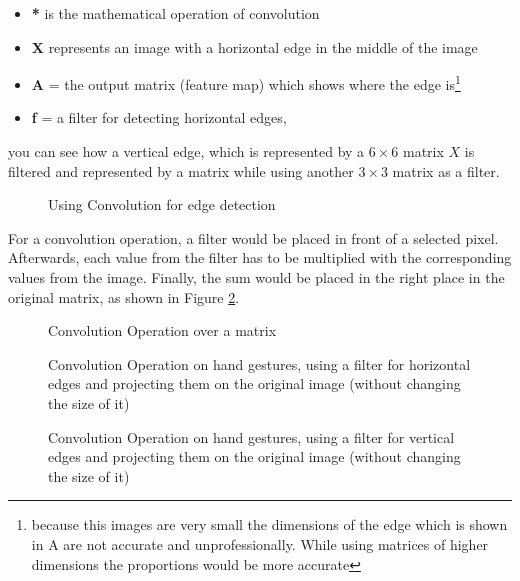 \begin{itemize}
	\item \textbf{*} is the mathematical operation of convolution
	\item \textbf{X} represents an image with a horizontal edge in the middle of the image
	\item \textbf{A} = the output matrix (feature map) which shows where the edge is\footnote{because this images are very small the dimensions of the edge which is shown in A are not accurate and unprofessionally. While using matrices of higher dimensions the proportions would be more accurate}
	\item \textbf{f} = a filter for detecting horizontal edges,
\end{itemize}

you can see how a vertical edge, which is represented by a
\( 6 \times 6\) matrix \(X\) is filtered and represented by a matrix while using another \( 3 \times 3\) matrix as a filter.

\begin{figure}[htp]
	\centering
	\caption{Using Convolution for edge detection}
	\label{fig:edge_detec}
\end{figure}

For a convolution operation, a filter would be placed in front of a selected pixel. Afterwards, each value from the filter has to be multiplied with the corresponding values from the image. Finally, the sum would be placed in the right place in the original matrix, as shown in Figure \ref{fig:conv}.

\begin{figure}[htp]
	\centering
	\caption{Convolution Operation over a matrix}
	\label{fig:conv}
\end{figure}

\begin{figure}[htp]
	\centering
	\caption{Convolution Operation on hand gestures, using a filter for horizontal edges and projecting them on the original image (without changing the size of it)}
	\label{fig:horizontal}
\end{figure}

\begin{figure}[htp]
	\centering
	\caption{Convolution Operation on hand gestures, using a filter for vertical edges and projecting them on the original image (without changing the size of it)}
	\label{fig:vert}
\end{figure}

